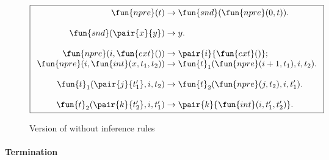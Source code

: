 \begin{figure}
\begin{equation*}
\boxed{
\begin{array}{r@{\;}c@{\;}l}
\fun{npre}(t) & \rightarrow & \fun{snd}(\fun{npre}(0,t)).\\
\\
\fun{snd}(\pair{x}{y}) & \rightarrow & y.\\
\\
\fun{npre}(i,\fun{ext}()) & \rightarrow & \pair{i}{\fun{ext}()};\\
\fun{npre}(i,\fun{int}(x,t_1,t_2)) & \rightarrow &
\fun{t}_1(\fun{npre}(i+1,t_1),i,t_2).\\
\\
\fun{t}_1(\pair{j}{t'_1},i,t_2) & \rightarrow &
\fun{t}_2(\fun{npre}(j,t_2),i,t'_1).\\
\\
\fun{t}_2(\pair{k}{t'_2},i,t'_1) & \rightarrow & \pair{k}{\fun{int}(i,t'_1,t'_2)}.
\end{array}
}
\end{equation*}
\caption{Version of  without inference rules}
\label{fig:npre_bis}
\end{figure}

\paragraph{Termination}

